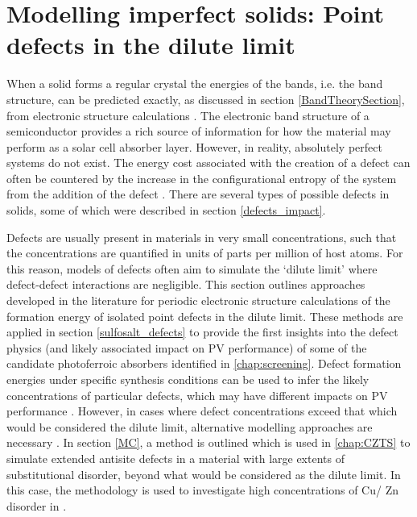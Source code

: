 \documentclass[11pt, twoside]{report}
\begin{document}
\section{Modelling imperfect solids: Point defects in the dilute limit}\label{defects_methods}
When a solid forms a regular crystal the energies of the bands, i.e. the band structure, can be predicted exactly, as discussed in section \ref{BandTheorySection}, from electronic structure calculations \cite{Nelson3}.
The electronic band structure of a semiconductor provides a rich source of information for how the material may perform as a solar cell absorber layer. However, in reality, absolutely perfect systems do not exist. The energy cost associated with the creation of a defect can often be countered by the increase in the configurational entropy of the system from the addition of the defect \cite{AshcroftMermin_general}.
There are several types of possible defects in solids, some of which were described in section \ref{defects_impact}. 

Defects are usually present in materials in very small concentrations, such that the concentrations are quantified in units of parts per million of host atoms. For this reason, models of defects often aim to simulate the `dilute limit' where defect-defect interactions are negligible. This section outlines approaches developed in the literature for periodic electronic structure calculations of the formation energy of isolated point defects in the dilute limit.
These methods are applied in section \ref{sulfosalt_defects} to provide the first insights into the defect physics (and likely associated impact on PV performance) of some of the candidate photoferroic absorbers identified in \autoref{chap:screening}. 
Defect formation energies under specific synthesis conditions can be used to infer the likely concentrations of particular defects, which may have different impacts on PV performance \cite{Aron_defect_tolerance}. 
However, in cases where defect concentrations exceed that which would be considered the dilute limit, alternative modelling approaches are necessary \cite{high_defect_conc_method, defects_beyond_dilute_lim}. In section \ref{MC}, a method is outlined which is used in \autoref{chap:CZTS} to simulate extended antisite defects in a material with large extents of substitutional disorder, beyond what would be considered as the dilute limit. In this case, the methodology is used to investigate high concentrations of Cu/ Zn disorder in {\CZTS}. 
\end{document}
